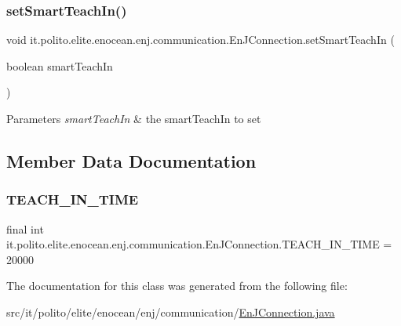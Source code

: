 \subsubsection{\texorpdfstring{set\+Smart\+Teach\+In()}{setSmartTeachIn()}}
{\footnotesize\ttfamily void it.\+polito.\+elite.\+enocean.\+enj.\+communication.\+En\+J\+Connection.\+set\+Smart\+Teach\+In (\begin{DoxyParamCaption}\item[{boolean}]{smart\+Teach\+In }\end{DoxyParamCaption})}


\begin{DoxyParams}{Parameters}
{\em smart\+Teach\+In} & the smart\+Teach\+In to set \\
\hline
\end{DoxyParams}


\subsection{Member Data Documentation}
\hypertarget{classit_1_1polito_1_1elite_1_1enocean_1_1enj_1_1communication_1_1_en_j_connection_a1584089c4459a927b1cd99c8d2249773}{}\label{classit_1_1polito_1_1elite_1_1enocean_1_1enj_1_1communication_1_1_en_j_connection_a1584089c4459a927b1cd99c8d2249773} 
\subsubsection{\texorpdfstring{T\+E\+A\+C\+H\+\_\+\+I\+N\+\_\+\+T\+I\+ME}{TEACH\_IN\_TIME}}
{\footnotesize\ttfamily final int it.\+polito.\+elite.\+enocean.\+enj.\+communication.\+En\+J\+Connection.\+T\+E\+A\+C\+H\+\_\+\+I\+N\+\_\+\+T\+I\+ME = 20000\hspace{0.3cm}{\ttfamily [static]}}



The documentation for this class was generated from the following file\+:\begin{DoxyCompactItemize}
\item 
src/it/polito/elite/enocean/enj/communication/\hyperlink{_en_j_connection_8java}{En\+J\+Connection.\+java}\end{DoxyCompactItemize}
